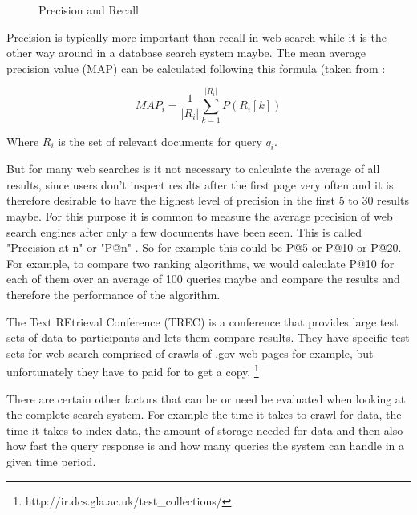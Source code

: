 \begin{figure}
\centering
{}
\caption[Precision and Recall]{Precision and Recall}
\label{fig:PR}
\end{figure}

Precision is typically more important than recall in web search while it is the other way around in a database search system maybe. The mean average precision value (MAP) can be calculated following this formula (taken from \citep[p.141]{Baeza-Yates2011}:

\begin{equation}
MAP_i = \frac{1}{\left|R_i\right|} \sum_{k=1}^{\left|R_i\right|} P\left(R_i\left[k\right]\right)
\end{equation}

Where $R_i$ is the set of relevant documents for query $q_i$.

But for many web searches is it not necessary to calculate the average of all results, since users don't inspect results after the first page very often and it is therefore desirable to have the highest level of precision in the first 5 to 30 results maybe. For this purpose it is common to measure the average precision of web search engines after only a few documents have been seen. This is called "Precision at n" or "P@n" \citep[p.140]{Baeza-Yates2011}. So for example this could be P@5 or P@10 or P@20. For example, to compare two ranking algorithms, we would calculate P@10 for each of them over an average of 100 queries maybe and compare the results and therefore the performance of the algorithm.

The Text REtrieval Conference (TREC) is a conference that provides large test sets of data to participants and lets them compare results. They have specific test sets for web search comprised of crawls of .gov web pages for example, but unfortunately they have to paid for to get a copy. \footnote{http://ir.dcs.gla.ac.uk/test_collections/}

There are certain other factors that can be or need be evaluated when looking at the complete search system. For example the time it takes to crawl for data, the time it takes to index data, the amount of storage needed for data and then also how fast the query response is and how many queries the system can handle in a given time period.


